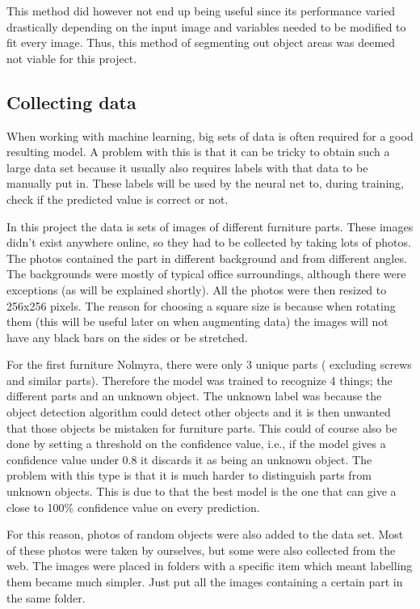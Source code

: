 This method did however not end up being useful since its performance varied drastically depending on the input image and variables needed to be modified to fit every image. Thus, this method of segmenting out object areas was deemed not viable for this project.

\subsection{Collecting data}
When working with machine learning, big sets of data is often required for a good resulting model.
A problem with this is that it can be tricky to obtain such a large data set because it usually also requires
labels with that data to be manually put in. These labels will be used by the neural net to, during training, check if
the predicted value is correct or not.

In this project the data is sets of images of different furniture parts. These images didn't exist anywhere online, so they had to be collected by taking lots of photos. The photos contained the part in different background and from different angles. The backgrounds were mostly of typical office surroundings, although there were exceptions (as will be explained shortly). All the photos were then resized to 256x256 pixels. The reason for choosing a square size is because when rotating them (this will be useful later on when augmenting data) the images will not have any black bars on the sides or be stretched.

For the first furniture Nolmyra, there were only 3 unique parts ( excluding screws and similar parts). Therefore the model was trained to recognize 4 things; the different parts and an unknown object. The unknown label was because the object detection algorithm could detect other objects and it is then unwanted that those objects be mistaken for furniture parts. This could of course also be done by setting a threshold on the confidence value, i.e., if the model gives a confidence value under 0.8 it discards it as being an unknown object. The problem with this type is that it is much harder to distinguish parts from unknown objects. This is due to that the best model is the one that can give a close to 100\% confidence value on every prediction.

For this reason, photos of random objects were also added to the data set. Most of these photos were taken by ourselves, but some were also collected from the web. The images were placed in folders with a specific item which meant labelling them became much simpler. Just put all the images containing a certain part in the same folder.

